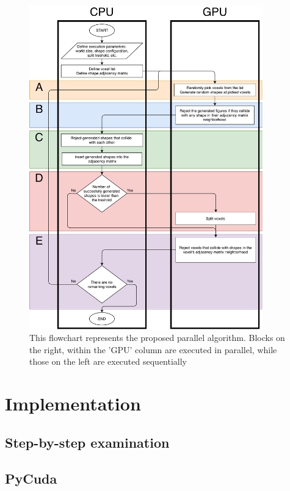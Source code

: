 \documentclass[12pt, oneside]{report}
\begin{document}
\begin{figure}[h]
  \centering
	\label{GPURSABlockDiagramPdf}
	\includegraphics[width=0.9\textwidth,height=0.9\textheight,keepaspectratio]{Images/GPURSA/GPUDiagram1.pdf}
	\caption{This flowchart represents the proposed parallel algorithm. \newline
		Blocks on the right, within the 'GPU' column are executed in parallel, while those on the left are executed sequentially}
\end{figure}

\section {Implementation}
\subsection{Step-by-step examination}
\subsection{PyCuda}
\end{document}
